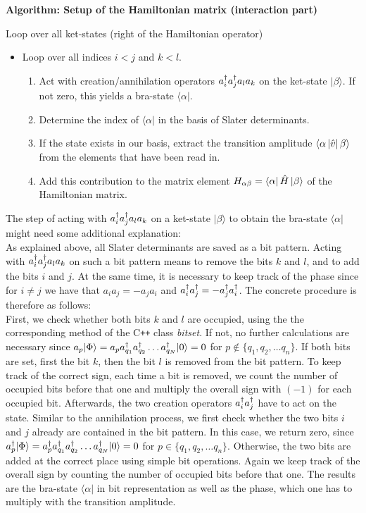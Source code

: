  \begin{framed}
\begin{center}
\textbf{Algorithm: Setup of the Hamiltonian matrix (interaction part)}
\end{center}
Loop over all ket-states (right of the Hamiltonian operator)
 \begin{itemize}
 \item Loop over all indices $i<j$ and $k<l$. 
 \begin{enumerate}
 \item Act with creation/annihilation operators  $a^{\dagger}_i a^{\dagger}_j a_l a_k $ on the ket-state $|\beta\rangle$. If not zero, this yields a bra-state $\langle \alpha |$.
 \item Determine the index of $\langle \alpha |$ in the basis of Slater determinants.
 \item If the state exists in our basis, extract the transition amplitude  $\left\langle \alpha \left| \hat{v} \right| \beta \right\rangle$ from the elements that have been read in.
 \item Add this contribution to the matrix element $H_{\alpha \beta} = \left\langle \alpha \right| \hat{H} \left| \beta \right\rangle$ of the Hamiltonian matrix. 
 \end{enumerate}
 \end{itemize}
 \end{framed}
The step of acting with $a^{\dagger}_i a^{\dagger}_j a_l a_k $ on a ket-state $|\beta\rangle$ to obtain the bra-state $\langle \alpha |$ might need some additional explanation:\\
As explained above, all Slater determinants are saved as a bit pattern.
 Acting with $a^{\dagger}_i a^{\dagger}_j a_l a_k $ on such a bit pattern means to remove the bits $k$ and $l$, and to add the bits $i$ and $j$. 
 At the same time, it is necessary to keep track of the phase since for $i\neq j$ we have that $a_i a_j = -a_j a_i$ and $a^{\dagger}_i a^{\dagger}_j = -a^{\dagger}_j a^{\dagger}_i$. The concrete procedure is therefore as follows:\\
First, we check whether both bits $k$ and $l$ are occupied, using the the corresponding method of the C{}\verb!++! class \textit{bitset}. If not, no further calculations are necessary since $a_p |\Phi\rangle = a_p a^{\dagger}_{q_1}a^{\dagger}_{q_2}\dots a^{\dagger}_{q_N}|0\rangle = 0$ for $p \not\in \lbrace q_1,q_2,\dots q_n \rbrace$. If both bits are set, first the bit $k$, then the bit $l$ is removed from the bit pattern. To keep track of the correct sign, each time a bit is removed, we count the number of occupied bits before that one and multiply the overall sign with $(-1)$ for each occupied bit. Afterwards, the two creation operators $a^{\dagger}_i a^{\dagger}_j$ have to act on the state. Similar to the annihilation process, we first check whether the two bits $i$ and $j$ already are contained in the bit pattern. In this case, we return zero, since $a^{\dagger}_p |\Phi\rangle = a^{\dagger}_p a^{\dagger}_{q_1}a^{\dagger}_{q_2}\dots a^{\dagger}_{q_N}|0\rangle = 0$ for $p\in \lbrace q_1,q_2,\dots q_n \rbrace$. Otherwise, the two bits are added at the correct place using simple bit operations. Again we keep track of the overall sign by counting the number of occupied bits before that one. The results are the bra-state $\langle\alpha|$ in bit representation as well as the phase, which one has to multiply with the transition amplitude. 


